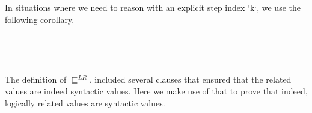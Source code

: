 In situations where we need to reason with an explicit step index `k`,
we use the following corollary.

\begin{code}%
\>[0]\AgdaSpace{}%
\AgdaSymbol{:}\AgdaSpace{}%
\AgdaSymbol{\}\{}\AgdaSymbol{\}\{}\AgdaSpace{}%
\AgdaSymbol{:}\AgdaSpace{}%
\AgdaSpace{}%
\AgdaSpace{}%
\AgdaSymbol{\}\{}\AgdaSymbol{\}\{}\AgdaSymbol{\}\{}\AgdaSymbol{\}\{}\AgdaSymbol{\}}\<%
\\
\>[0][@{}l@{\AgdaIndent{0}}]%
\>[2]\AgdaSpace{}%
\AgdaField{\#}\AgdaSymbol{(}\AgdaSpace{}%
\AgdaSpace{}%
\AgdaSpace{}%
\AgdaSpace{}%
\AgdaSpace{}%
\AgdaSpace{}%
\AgdaSymbol{)}\AgdaSpace{}%
\AgdaSymbol{(}\AgdaSpace{}%
\AgdaSymbol{)}\AgdaSpace{}%
\AgdaSpace{}%
\AgdaField{\#}\AgdaSymbol{(}\AgdaSpace{}%
\AgdaSpace{}%
\AgdaSpace{}%
\AgdaSpace{}%
\AgdaSymbol{)}\AgdaSpace{}%
\AgdaSymbol{(}\AgdaSpace{}%
\AgdaSymbol{)}\<%
\end{code}
\begin{code}[hide]%
\>[0]\AgdaSpace{}%
\AgdaSymbol{\{}\AgdaSymbol{\}\{}\AgdaSymbol{\}\{}\AgdaSymbol{\}\{}\AgdaSymbol{\}\{}\AgdaSymbol{\}\{}\AgdaSymbol{\}\{}\AgdaSymbol{\}}\AgdaSpace{}%
\AgdaSymbol{=}\<%
\\
\>[0][@{}l@{\AgdaIndent{0}}]%
\>[3]\AgdaSymbol{\{}\AgdaSpace{}%
\AgdaSymbol{=}\AgdaSpace{}%
\AgdaSpace{}%
\AgdaSymbol{\}}\AgdaSpace{}%
\AgdaSymbol{(}\AgdaSymbol{\{}\AgdaSymbol{\}\{}\AgdaSymbol{\}\{}\AgdaSymbol{\}\{}\AgdaSymbol{\}\{}\AgdaSymbol{\}\{}\AgdaSymbol{\})}\<%
\end{code}

The definition of $⊑^{LR}ᵥ$ included several clauses that ensured that
the related values are indeed syntactic values. Here we make use of
that to prove that indeed, logically related values are syntactic
values.

